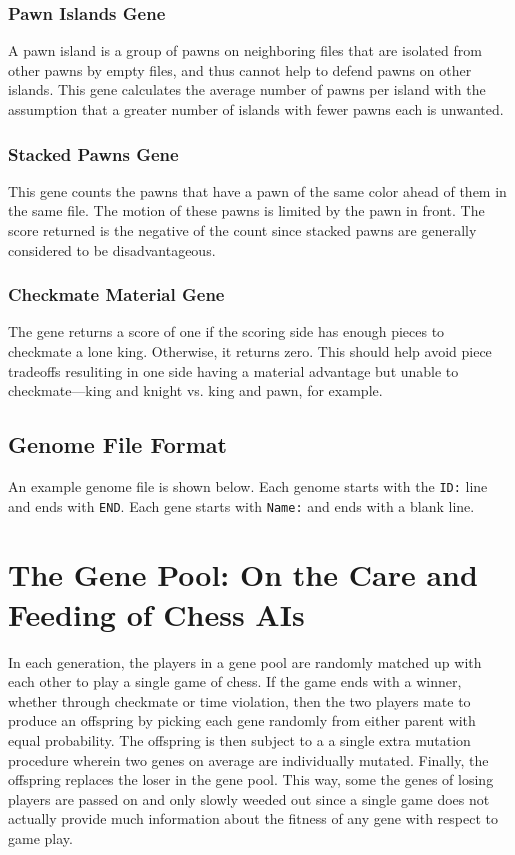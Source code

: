 \documentclass[letterpaper]{article}
\renewcommand{\_}{\allowbreak\textunderscore\allowbreak}
\begin{document}
\subsubsection{Pawn Islands Gene}
A pawn island is a group of pawns on neighboring files that are isolated from other pawns by empty files, and thus cannot help to defend pawns on other islands. This gene calculates the average number of pawns per island with the assumption that a greater number of islands with fewer pawns each is unwanted.

\subsubsection{Stacked Pawns Gene}
This gene counts the pawns that have a pawn of the same color ahead of them in the same file. The motion of these pawns is limited by the pawn in front. The score returned is the negative of the count since stacked pawns are generally considered to be disadvantageous.

\subsubsection{Checkmate Material Gene}
The gene returns a score of one if the scoring side has enough pieces to checkmate a lone king. Otherwise, it returns zero. This should help avoid piece tradeoffs resuliting in one side having a material advantage but unable to checkmate---king and knight vs\@. king and pawn, for example.


\subsection{Genome File Format}
An example genome file is shown below. Each genome starts with the \verb|ID:| line and ends with \verb|END|. Each gene starts with \verb|Name:| and ends with a blank line.



\section{The Gene Pool: On the Care and Feeding of Chess AIs}

In each generation, the players in a gene pool are randomly matched up with each other to play a single game of chess. If the game ends with a winner, whether through checkmate or time violation, then the two players mate to produce an offspring by picking each gene randomly from either parent with equal probability. The offspring is then subject to a a single extra mutation procedure wherein two genes on average are individually mutated. Finally, the offspring replaces the loser in the gene pool. This way, some the genes of losing players are passed on and only slowly weeded out since a single game does not actually provide much information about the fitness of any gene with respect to game play.
\end{document}
